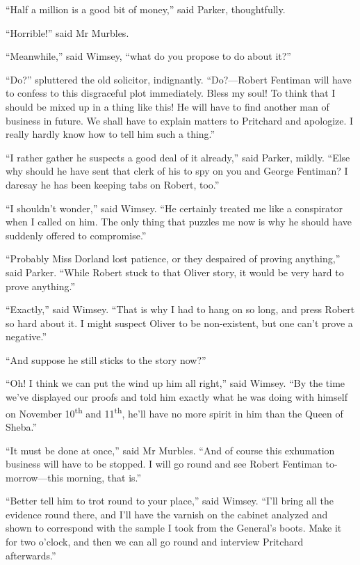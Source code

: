 \enquote{Half a million is a good bit of money,} said Parker, thoughtfully.

\enquote{Horrible!} said Mr Murbles.

\enquote{Meanwhile,} said Wimsey, \enquote{what do you propose to do about it?}

\enquote{Do?} spluttered the old solicitor, indignantly. \enquote{Do?---Robert Fentiman will have to confess to this disgraceful plot immediately. Bless my soul! To think that I should be mixed up in a thing like this! He will have to find another man of business in future. We shall have to explain matters to Pritchard and apologize. I really hardly know how to tell him such a thing.}

\enquote{I rather gather he suspects a good deal of it already,} said Parker, mildly. \enquote{Else why should he have sent that clerk of his to spy on you and George Fentiman? I daresay he has been keeping tabs on Robert, too.}

\enquote{I shouldn't wonder,} said Wimsey. \enquote{He certainly treated me like a conspirator when I called on him. The only thing that puzzles me now is why he should have suddenly offered to compromise.}

\enquote{Probably Miss Dorland lost patience, or they despaired of proving anything,} said Parker. \enquote{While Robert stuck to that Oliver story, it would be very hard to prove anything.}

\enquote{Exactly,} said Wimsey. \enquote{That is why I had to hang on so long, and press Robert so hard about it. I might suspect Oliver to be non-existent, but one can't prove a negative.}

\enquote{And suppose he still sticks to the story now?}

\enquote{Oh! I think we can put the wind up him all right,} said Wimsey. \enquote{By the time we've displayed our proofs and told him exactly what he was doing with himself on November  10\textsuperscript{th} and  11\textsuperscript{th}, he'll have no more spirit in him than the Queen of Sheba.}

\enquote{It must be done at once,} said Mr Murbles. \enquote{And of course this exhumation business will have to be stopped. I will go round and see Robert Fentiman to-morrow\allowbreak---\allowbreak this morning, that is.}

\enquote{Better tell him to trot round to your place,} said Wimsey. \enquote{I'll bring all the evidence round there, and I'll have the varnish on the cabinet analyzed and shown to correspond with the sample I took from the General's boots. Make it for two o'clock, and then we can all go round and interview Pritchard afterwards.}

